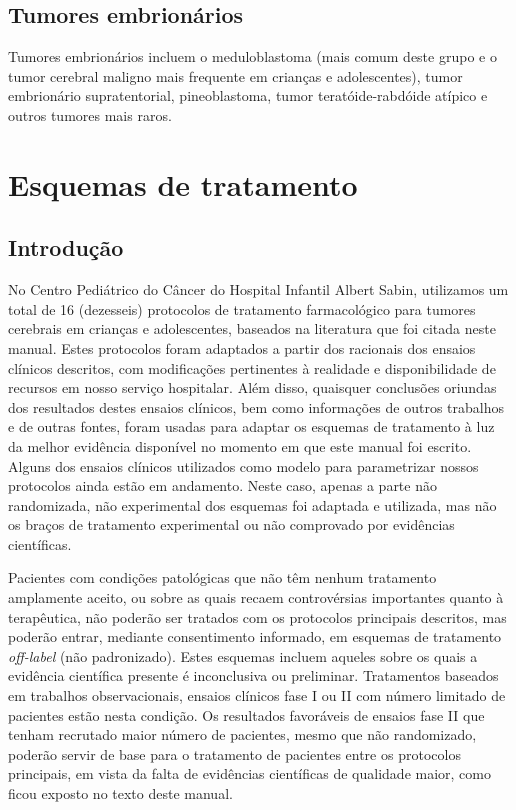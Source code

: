 \documentclass[11pt,a4paper,oldfontcommands]{memoir}
\begin{document}
\section{Tumores embrionários}

Tumores embrionários incluem o meduloblastoma (mais comum deste grupo e o tumor cerebral maligno mais frequente em crianças e adolescentes), tumor embrionário supratentorial, pineoblastoma, tumor teratóide-rabdóide atípico e outros tumores mais raros. 




\chapter{Esquemas de tratamento}

\section{Introdução}
No Centro Pediátrico do Câncer do Hospital Infantil Albert Sabin, utilizamos um total de 16 (dezesseis) protocolos de tratamento farmacológico para tumores cerebrais em crianças e adolescentes, baseados na literatura que foi citada neste manual. Estes protocolos foram adaptados a partir dos racionais dos ensaios clínicos descritos, com modificações pertinentes à realidade e disponibilidade de recursos em nosso serviço hospitalar. Além disso, quaisquer conclusões oriundas dos resultados destes ensaios clínicos, bem como informações de outros trabalhos e de outras fontes, foram usadas para adaptar os esquemas de tratamento à luz da melhor evidência disponível no momento em que este manual foi escrito. Alguns dos ensaios clínicos utilizados como modelo para parametrizar nossos protocolos ainda estão em andamento. Neste caso, apenas a parte não randomizada, não experimental dos esquemas foi adaptada e utilizada, mas não os braços de tratamento experimental ou não comprovado por evidências científicas.

Pacientes com condições patológicas que não têm nenhum tratamento amplamente aceito, ou sobre as quais recaem controvérsias importantes quanto à terapêutica, não poderão ser tratados com os protocolos principais descritos, mas poderão entrar, mediante consentimento informado, em esquemas de tratamento \textit{off-label} (não padronizado). Estes esquemas incluem aqueles sobre os quais a evidência científica presente é inconclusiva ou preliminar. Tratamentos baseados em trabalhos observacionais, ensaios clínicos fase I ou II com número limitado de pacientes estão nesta condição. Os resultados favoráveis de ensaios fase II que tenham recrutado maior número de pacientes, mesmo que não randomizado, poderão servir de base para o tratamento de pacientes entre os protocolos principais, em vista da falta de evidências científicas de qualidade maior, como ficou exposto no texto deste manual.
\end{document}
